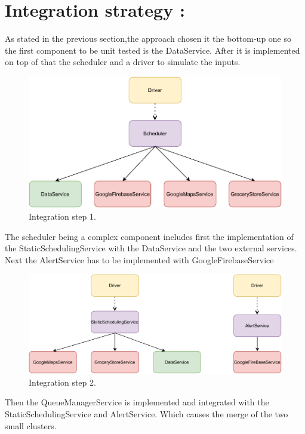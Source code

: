 \section{Integration strategy :}
As stated in the previous section,the approach chosen it the bottom-up one so the first component to be unit tested is the DataService. After it is implemented on top of that the scheduler and a driver to simulate the inputs.
\begin{figure}[H]
    \centering
    \includegraphics[width=1.0\textwidth]{images/component1.pdf}
    \caption{Integration step 1.}
\end{figure}
The scheduler being a complex component includes first the implementation of the StaticSchedulingService with the DataService and the two external services. Next the AlertService has to be implemented with GoogleFirebaseService
\begin{figure}[H]
    \centering
    \includegraphics[width=1.0\textwidth]{images/component2.pdf}
    \caption{Integration step 2.}
\end{figure}
Then the QueueManagerService is implemented and integrated with the StaticSchedulingService and AlertService. Which causes the merge of the two small clusters.
